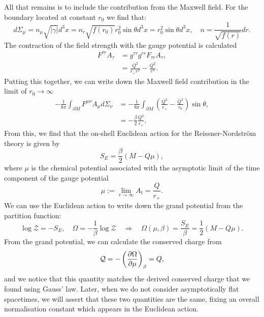 All that remains is to include the contribution from the Maxwell field. For the boundary located at constant $r_0$ we find that:
\begin{equation*}
	d\Sigma_\mu = n_\mu \sqrt{|\gamma|} d^3x = n_r \sqrt{f(r_0)} r_0^2 \sin \theta d^3x = r_0^2 \sin \theta d^3x, \quad n = \frac{1}{\sqrt{f(r)}} dr.
\end{equation*}
The contraction of the field strength with the gauge potential is calculated 
\begin{equation*}
	\begin{aligned}
		F^{\tau r} A_\tau &= g^{\tau \tau}g^{rr} F_{\tau r} A_{\tau}, \\
		&= \frac{Q^2}{r_+r^2} - \frac{Q^2}{r^3}.
	\end{aligned}
\end{equation*}
Putting this together, we can write down the Maxwell field contribution in the limit of $r_0 \rightarrow \infty$
\begin{equation*}
	\begin{aligned}
		-\frac{1}{8\pi} \int_{\partial M} F^{\mu \nu}A_\mu d\Sigma_\nu 
		&= -\frac{1}{8\pi} \int_{\partial M} \left(\frac{Q^2}{r_+} - \frac{Q^2}{r_0} \right) \sin\theta ,\\
		&= -\frac{\beta}{2} \frac{Q^2}{r_+}.
	\end{aligned}
\end{equation*}
From this, we find that the on-shell Euclidean action for the Reissner-Nordstr\"om theory is given by
\begin{equation}
	S_E = \frac{\beta}{2} (M - Q\mu),
\end{equation}
where $\mu$ is the chemical potential associated with the asymptotic limit of the time component of the gauge potential
\begin{equation}
\label{eq:rnchempot}
	\mu := \lim_{r\rightarrow \infty} A_t = \frac{Q}{r_+}.
\end{equation}
We can use the Euclidean action to write down the grand potential from the partition function:
\begin{equation*}
	\log \mathcal{Z} = -S_E, \quad \Omega = -\frac{1}{\beta} \log \mathcal{Z} \quad \Rightarrow \quad \Omega(\mu, \beta)  = \frac{S_E}{\beta} = \frac{1}{2} (M - Q\mu).
\end{equation*}
From the grand potential, we can calculate the conserved charge from
\begin{equation*}
	\mathcal{Q} = -\left(\frac{\partial \Omega}{\partial \mu} \right)_\beta = Q,
\end{equation*}
and we notice that this quantity matches the derived conserved charge  that we found using Gauss' law. Later, when we do not consider asymptotically flat spacetimes, we will assert that these two quantities are the same, fixing an overall normalisation constant which appears in the Euclidean action.

